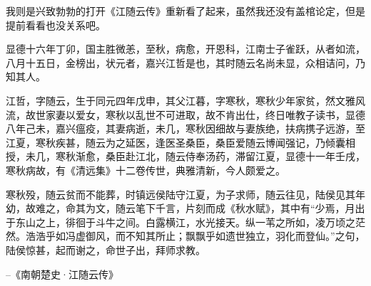 我则是兴致勃勃的打开《江随云传》重新看了起来，虽然我还没有盖棺论定，但是提前看看也没关系吧。

显德十六年丁卯，国主胜微恙，至秋，病愈，开恩科，江南士子雀跃，从者如流，八月十五日，金榜出，状元者，嘉兴江哲是也，其时随云名尚未显，众相诘问，乃知其人。

江哲，字随云，生于同元四年戊申，其父江暮，字寒秋，寒秋少年家贫，然文雅风流，故世家妻以爱女，寒秋以乱世不可进取，故不肯出仕，终日唯教子读书，显德八年己未，嘉兴瘟疫，其妻病逝，未几，寒秋因细故与妻族绝，扶病携子远游，至江夏，寒秋疾甚，随云为之延医，逢医圣桑臣，桑臣爱随云博闻强记，乃倾囊相授，未几，寒秋渐愈，桑臣赴江北，随云侍奉汤药，滞留江夏，显德十一年壬戌，寒秋病故，有《清远集》十二卷传世，典雅清新，今人颇爱之。

寒秋殁，随云贫而不能葬，时镇远侯陆守江夏，为子求师，随云往见，陆侯见其年幼，故难之，命其为文，随云笔下千言，片刻而成《秋水赋》，其中有“少焉，月出于东山之上，徘徊于斗牛之间。白露横江，水光接天。纵一苇之所如，凌万顷之茫然。浩浩乎如冯虚御风，而不知其所止；飘飘乎如遗世独立，羽化而登仙。”之句，陆侯惊甚，起而谢之，命世子出，拜师求教。

--《南朝楚史·江随云传》
